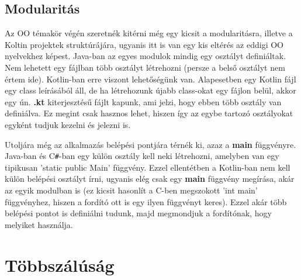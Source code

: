 \subsection{Modularitás}
\label{subsec:k_mod}

Az OO témakör végén szeretnék kitérni még egy kicsit a modularitásra, illetve a Koltin projektek struktúrájára, ugyanis itt is van egy kis eltérés az eddigi OO nyelvekhez képest. Java-ban az egyes modulok mindig egy osztályt definiáltak. Nem lehetett egy fájlban több osztályt létrehozni (persze a belső osztályt nem értem ide). Kotlin-ban erre viszont lehetőségünk van. Alapesetben egy Kotlin fájl egy class leírásából áll, de ha létrehozunk újabb class-okat egy fájlon belül, akkor egy ún. \textbf{.kt} kiterjesztésű fájlt kapunk, ami jelzi, hogy ebben több osztály van definiálva. Ez megint csak hasznos lehet, hiszen így az egybe tartozó osztályokat egyként tudjuk kezelni és jelezni is.

Utoljára még az alkalmazás belépési pontjára térnék ki, azaz a \textbf{main} függvényre. Java-ban és C\verb|#|-ban egy külön osztály kell neki létrehozni, amelyben van egy tipikusan 'static public Main' függvény. Ezzel ellentétben a Kotlin-ban nem kell külön belépési osztályt írni, ugyanis elég csak egy \textbf{main} függvény megírása, akár az egyik modulban is (ez kicsit hasonlít a C-ben megszokott 'int main' függvényhez, hiszen a fordító ott is egy ilyen függvényt keres). Ezzel akár több belépési pontot is definiálni tudunk, majd megmondjuk a fordítónak, hogy melyiket használja.

\section{Többszálúság}
\label{sec:k_thread}

